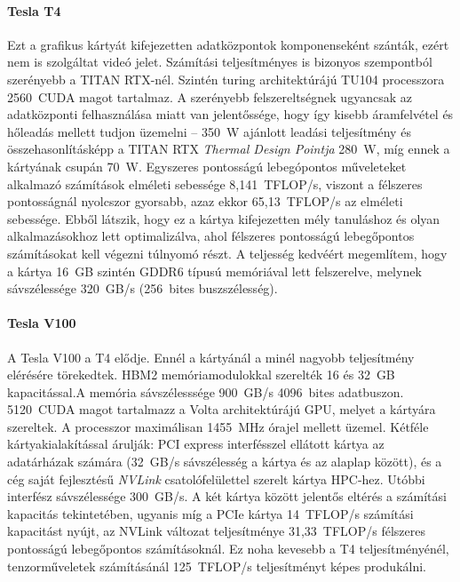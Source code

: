 \paragraph{Tesla T4}
Ezt a grafikus kártyát kifejezetten adatközpontok komponenseként szánták, ezért nem is szolgáltat videó jelet. Számítási teljesítményes is bizonyos szempontból szerényebb a TITAN RTX-nél. Szintén turing architektúrájú TU104 processzora 2560~CUDA magot tartalmaz. A szerényebb felszereltségnek ugyancsak az adatközponti felhasználása miatt van jelentőssége, hogy így kisebb áramfelvétel és hőleadás mellett tudjon üzemelni -- 350~W ajánlott leadási teljesítmény és összehasonlításképp a TITAN RTX \emph{Thermal Design Pointja} 280~W, míg ennek a kártyának csupán 70~W. Egyszeres pontosságú lebegópontos műveleteket alkalmazó számítások elméleti sebessége 8,141~TFLOP/s, viszont a félszeres pontosságnál nyolcszor gyorsabb, azaz ekkor 65,13~TFLOP/s az elméleti sebessége. Ebből látszik, hogy ez a kártya kifejezetten mély tanuláshoz és olyan alkalmazásokhoz lett optimalizálva, ahol félszeres pontosságú lebegőpontos számításokat kell végezni túlnyomó részt. A teljesség kedvéért megemlítem, hogy a kártya 16~GB szintén GDDR6 típusú memóriával lett felszerelve, melynek sávszélessége 320~GB/s (256~bites buszszélesség).

\paragraph{Tesla V100}
A Tesla V100 a T4 elődje. Ennél a kártyánál a minél nagyobb teljesítmény elérésére törekedtek. HBM2 memóriamodulokkal szerelték 16 és 32~GB kapacitással.A memória sávszélesssége 900~GB/s 4096~bites adatbuszon. 5120~CUDA magot tartalmazz a Volta architektúrájú GPU, melyet a kártyára szereltek. A processzor maximálisan 1455~MHz órajel mellett üzemel. Kétféle kártyakialakítással árulják: PCI express interfésszel ellátott kártya az adatárházak számára (32~GB/s sávszélesség a kártya és az alaplap között), és a cég saját fejlesztésű \emph{NVLink} csatolófelülettel szerelt kártya HPC-hez. Utóbbi interfész sávszélessége 300~GB/s. A két kártya között jelentős eltérés a számítási kapacitás tekintetében, ugyanis míg a PCIe kártya 14~TFLOP/s számítási kapacitást nyújt, az NVLink változat teljesítménye 31,33~TFLOP/s félszeres pontosságú lebegőpontos számításoknál. Ez noha kevesebb a T4 teljesítményénél, tenzorműveletek számításánál 125~TFLOP/s teljesítményt képes produkálni.\cite{v100-datasheet}


